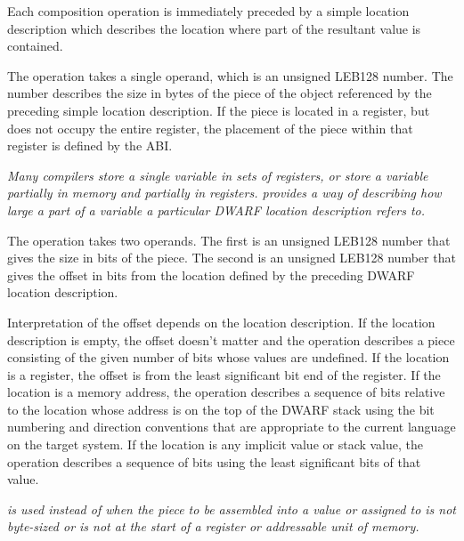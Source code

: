 Each composition operation is immediately preceded by a simple
location description which describes the location where part
of the resultant value is contained.
\begin{enumerate}[1. ]
\itembfnl{\DWOPpieceTARG}
The \DWOPpieceNAME{} operation takes a 
single operand, which is an
unsigned LEB128 number.  
The number describes the size in bytes
of the piece of the object referenced by the preceding simple
location description. If the piece is located in a register,
but does not occupy the entire register, the placement of
the piece within that register is defined by the ABI.

\textit{Many compilers store a single variable in sets of registers,
or store a variable partially in memory and partially in
registers. \DWOPpieceNAME{} provides a way of describing how large
a part of a variable a particular DWARF location description
refers to.}

\itembfnl{\DWOPbitpieceTARG}
The \DWOPbitpieceNAME{} 
operation takes two operands. The first
is an unsigned LEB128 
number that gives the size in bits
of the piece. The second is an 
unsigned LEB128 number that
gives the offset in bits from the location defined by the
preceding DWARF location description.  

Interpretation of the
offset depends on the 
\bb\eb
location description. If the
location description is empty, the offset doesn\textquoteright t matter and
the \DWOPbitpieceNAME{} operation describes a piece consisting
of the given number of bits whose values are undefined. If
the location is a register, the offset is from the least
significant bit end of the register. If the location is a
memory address, the \DWOPbitpieceNAME{} operation describes a
sequence of bits relative to the location whose address is
on the top of the DWARF stack using the bit numbering and
direction conventions that are appropriate to the current
language on the target system. If the location is any implicit
value or stack value, the \DWOPbitpieceNAME{} operation describes
a sequence of bits using the least significant bits of that
value.  
\end{enumerate}

\textit{\DWOPbitpieceNAME{} is 
used instead of \DWOPpieceNAME{} when
the piece to be assembled into a value or assigned to is not
byte-sized or is not at the start of a register or addressable
unit of memory.}

